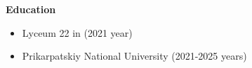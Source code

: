{\vspace{1cm} \hspace{-1cm} \Large \textbf{Education}}

\begin{itemize}
    \item Lyceum 22 in (2021 year)
    \item Prikarpatskiy National University (2021-2025 years)
\end{itemize}